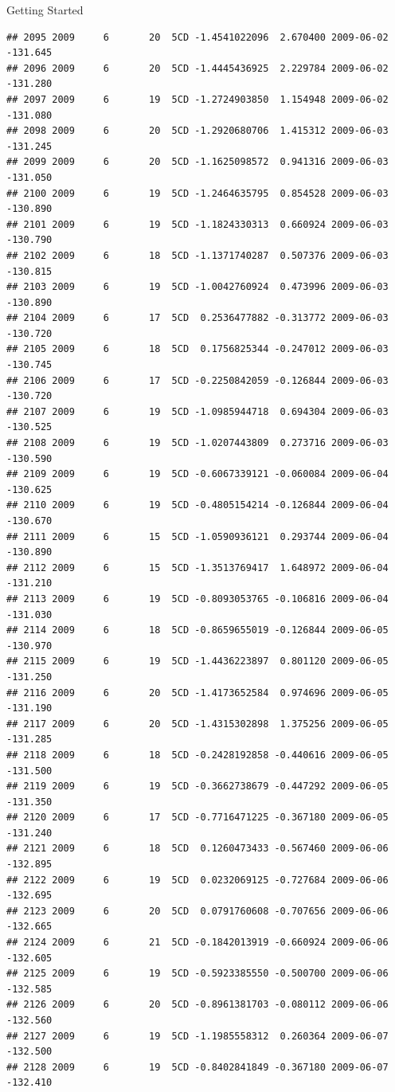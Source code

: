 \documentclass[
  ignorenonframetext,
]{beamer}
\begin{document}
\begin{frame}[fragile]{Getting Started}
\begin{verbatim}
## 2095 2009     6       20  5CD -1.4541022096  2.670400 2009-06-02 -131.645
## 2096 2009     6       20  5CD -1.4445436925  2.229784 2009-06-02 -131.280
## 2097 2009     6       19  5CD -1.2724903850  1.154948 2009-06-02 -131.080
## 2098 2009     6       20  5CD -1.2920680706  1.415312 2009-06-03 -131.245
## 2099 2009     6       20  5CD -1.1625098572  0.941316 2009-06-03 -131.050
## 2100 2009     6       19  5CD -1.2464635795  0.854528 2009-06-03 -130.890
## 2101 2009     6       19  5CD -1.1824330313  0.660924 2009-06-03 -130.790
## 2102 2009     6       18  5CD -1.1371740287  0.507376 2009-06-03 -130.815
## 2103 2009     6       19  5CD -1.0042760924  0.473996 2009-06-03 -130.890
## 2104 2009     6       17  5CD  0.2536477882 -0.313772 2009-06-03 -130.720
## 2105 2009     6       18  5CD  0.1756825344 -0.247012 2009-06-03 -130.745
## 2106 2009     6       17  5CD -0.2250842059 -0.126844 2009-06-03 -130.720
## 2107 2009     6       19  5CD -1.0985944718  0.694304 2009-06-03 -130.525
## 2108 2009     6       19  5CD -1.0207443809  0.273716 2009-06-03 -130.590
## 2109 2009     6       19  5CD -0.6067339121 -0.060084 2009-06-04 -130.625
## 2110 2009     6       19  5CD -0.4805154214 -0.126844 2009-06-04 -130.670
## 2111 2009     6       15  5CD -1.0590936121  0.293744 2009-06-04 -130.890
## 2112 2009     6       15  5CD -1.3513769417  1.648972 2009-06-04 -131.210
## 2113 2009     6       19  5CD -0.8093053765 -0.106816 2009-06-04 -131.030
## 2114 2009     6       18  5CD -0.8659655019 -0.126844 2009-06-05 -130.970
## 2115 2009     6       19  5CD -1.4436223897  0.801120 2009-06-05 -131.250
## 2116 2009     6       20  5CD -1.4173652584  0.974696 2009-06-05 -131.190
## 2117 2009     6       20  5CD -1.4315302898  1.375256 2009-06-05 -131.285
## 2118 2009     6       18  5CD -0.2428192858 -0.440616 2009-06-05 -131.500
## 2119 2009     6       19  5CD -0.3662738679 -0.447292 2009-06-05 -131.350
## 2120 2009     6       17  5CD -0.7716471225 -0.367180 2009-06-05 -131.240
## 2121 2009     6       18  5CD  0.1260473433 -0.567460 2009-06-06 -132.895
## 2122 2009     6       19  5CD  0.0232069125 -0.727684 2009-06-06 -132.695
## 2123 2009     6       20  5CD  0.0791760608 -0.707656 2009-06-06 -132.665
## 2124 2009     6       21  5CD -0.1842013919 -0.660924 2009-06-06 -132.605
## 2125 2009     6       19  5CD -0.5923385550 -0.500700 2009-06-06 -132.585
## 2126 2009     6       20  5CD -0.8961381703 -0.080112 2009-06-06 -132.560
## 2127 2009     6       19  5CD -1.1985558312  0.260364 2009-06-07 -132.500
## 2128 2009     6       19  5CD -0.8402841849 -0.367180 2009-06-07 -132.410

\end{verbatim}
\end{frame}
\end{document}
